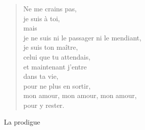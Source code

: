 \documentclass[11pt,a4paper]{book}
\begin{document}
\begin{verse}
\newpage

Ne me crains pas, \\
je suis à toi, \\
mais \\
je ne suis ni le passager ni le mendiant, \\
je suis ton maître, \\
celui que tu attendais, \\
et maintenant j'entre \\
dans ta vie, \\
pour ne plus en sortir, \\
mon amour, mon amour, mon amour, \\
pour y rester.
\end{verse}

\newpage

{\huge La prodigue} \\ \\
\end{document}
